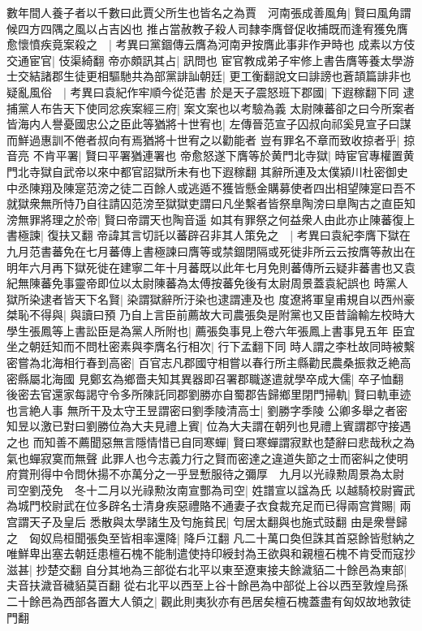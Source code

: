 數年間人養子者以千數曰此賈父所生也皆名之為賈　河南張成善風角|{
	賢曰風角謂候四方四隅之風以占吉凶也}
推占當赦教子殺人司隸李膺督促收捕既而逢宥獲免膺愈懷憤疾竟案殺之　|{
	考異曰黨錮傳云膺為河南尹按膺此事非作尹時也}
成素以方伎交通宦官|{
	伎渠綺翻}
帝亦頗訊其占|{
	訊問也}
宦官教成弟子牢修上書告膺等養太學游士交結諸郡生徒更相驅馳共為部黨誹訕朝廷|{
	更工衡翻說文曰誹謗也蒼頡篇誹非也}
疑亂風俗　|{
	考異曰袁紀作牢順今從范書}
於是天子震怒班下郡國|{
	下遐稼翻下同}
逮捕黨人布告天下使同忿疾案經三府|{
	案文案也以考驗為義}
太尉陳蕃卻之曰今所案者皆海内人譽憂國忠公之臣此等猶將十世宥也|{
	左傳晉范宣子囚叔向祁奚見宣子曰謀而鮮過惠訓不倦者叔向有焉猶將十世宥之以勸能者}
豈有罪名不章而致收掠者乎|{
	掠音亮}
不肯平署|{
	賢曰平署猶連署也}
帝愈怒遂下膺等於黄門北寺獄|{
	時宦官專權置黄門北寺獄自武帝以來中都官詔獄所未有也下遐稼翻}
其辭所連及太僕潁川杜密御史中丞陳翔及陳寔范滂之徒二百餘人或逃遁不獲皆懸金購募使者四出相望陳寔曰吾不就獄衆無所恃乃自往請囚范滂至獄獄吏謂曰凡坐繫者皆祭臯陶滂曰臯陶古之直臣知滂無罪將理之於帝|{
	賢曰帝謂天也陶音遥}
如其有罪祭之何益衆人由此亦止陳蕃復上書極諫|{
	復扶又翻}
帝諱其言切託以蕃辟召非其人策免之　|{
	考異曰袁紀李膺下獄在九月范書蕃免在七月蕃傳上書極諫曰膺等或禁錮閉隔或死徙非所云云按膺等赦出在明年六月再下獄死徙在建寧二年十月蕃既以此年七月免則蕃傳所云疑非蕃書也又袁紀無陳蕃免事靈帝即位以太尉陳蕃為太傅按蕃免後有太尉周景蓋袁紀誤也}
時黨人獄所染逮者皆天下名賢|{
	染謂獄辭所汙染也逮謂連及也}
度遼將軍皇甫規自以西州豪桀恥不得與|{
	與讀曰預}
乃自上言臣前薦故大司農張奐是附黨也又臣昔論輸左校時大學生張鳳等上書訟臣是為黨人所附也|{
	薦張奐事見上卷六年張鳳上書事見五年}
臣宜坐之朝廷知而不問杜密素與李膺名行相次|{
	行下孟翻下同}
時人謂之李杜故同時被繫密嘗為北海相行春到高密|{
	百官志凡郡國守相嘗以春行所主縣勸民農桑振救乏絶高密縣屬北海國}
見鄭玄為鄉嗇夫知其異器即召署郡職遂遣就學卒成大儒|{
	卒子恤翻}
後密去官還家每謁守令多所陳託同郡劉勝亦自蜀郡告歸鄉里閉門掃軌|{
	賢曰軌車迹也言絶人事}
無所干及太守王昱謂密曰劉季陵清高士|{
	劉勝字季陵}
公卿多舉之者密知昱以激已對曰劉勝位為大夫見禮上賓|{
	位為大夫謂在朝列也見禮上賓謂郡守接遇之也}
而知善不薦聞惡無言隱情惜已自同寒蟬|{
	賢曰寒蟬謂寂默也楚辭曰悲哉秋之為氣也蟬寂寞而無聲}
此罪人也今志義力行之賢而密達之違道失節之士而密糾之使明府賞刑得中令問休揚不亦萬分之一乎昱慙服待之彌厚　九月以光祿勲周景為太尉　司空劉茂免　冬十二月以光祿勲汝南宣酆為司空|{
	姓譜宣以諡為氏}
以越騎校尉竇武為城門校尉武在位多辟名士清身疾惡禮賂不通妻子衣食裁充足而已得兩宫賞賜|{
	兩宫謂天子及皇后}
悉散與太學諸生及匄施貧民|{
	匄居太翻與也施式豉翻}
由是衆譽歸之　匈奴烏桓聞張奐至皆相率還降|{
	降戶江翻}
凡二十萬口奐但誅其首惡餘皆慰納之唯鮮卑出塞去朝廷患檀石槐不能制遣使持印綬封為王欲與和親檀石槐不肯受而寇抄滋甚|{
	抄楚交翻}
自分其地為三部從右北平以東至遼東接夫餘濊貊二十餘邑為東部|{
	夫音扶濊音穢貊莫百翻}
從右北平以西至上谷十餘邑為中部從上谷以西至敦煌烏孫二十餘邑為西部各置大人領之|{
	觀此則夷狄亦有邑居矣檀石槐蓋盡有匈奴故地敦徒門翻}


